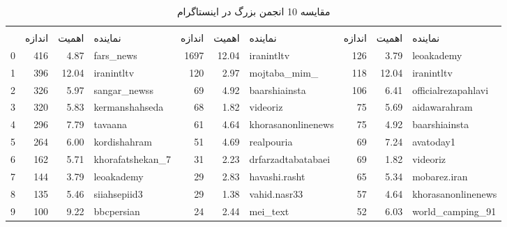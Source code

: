 \documentclass{article}
\begin{document}
	\begin{table}[h!]
		\centering
		\caption{مقایسه 10 انجمن بزرگ در اینستاگرام}
		\label{tab:instagram}
		\begin{tabular}{lrrlrrlrrl}
			\toprule
			& \multicolumn{3}{c}{\lr{Louvain}} & \multicolumn{3}{c}{\lr{Label Propagation}} & \multicolumn{3}{c}{\lr{Infomap}} \\
			\cmidrule(lr){2-4} \cmidrule(lr){5-7} \cmidrule(lr){8-10}
			& اندازه & اهمیت & نماینده & اندازه & اهمیت & نماینده & اندازه & اهمیت & نماینده \\
			0 & 416 & 4.87 & fars\_news & 1697 & 12.04 & iranintltv & 126 & 3.79 & leoakademy \\
			1 & 396 & 12.04 & iranintltv & 120 & 2.97 & mojtaba\_mim\_ & 118 & 12.04 & iranintltv \\
			2 & 326 & 5.97 & sangar\_newss & 69 & 4.92 & baarshiainsta & 106 & 6.41 & officialrezapahlavi \\
			3 & 320 & 5.83 & kermanshahseda & 68 & 1.82 & videoriz & 75 & 5.69 & aidawarahram \\
			4 & 296 & 7.79 & tavaana & 61 & 4.64 & khorasanonlinenews & 75 & 4.92 & baarshiainsta \\
			5 & 264 & 6.00 & kordishahram & 51 & 4.69 & realpouria & 69 & 7.24 & avatoday1 \\
			6 & 162 & 5.71 & khorafatshekan\_7 & 31 & 2.23 & drfarzadtabatabaei & 69 & 1.82 & videoriz \\
			7 & 144 & 3.79 & leoakademy & 29 & 2.83 & havashi.rasht & 65 & 5.34 & mobarez.iran \\
			8 & 135 & 5.46 & siiahsepiid3 & 29 & 1.38 & vahid.nasr33 & 57 & 4.64 & khorasanonlinenews \\
			9 & 100 & 9.22 & bbcpersian & 24 & 2.44 & mei\_text & 52 & 6.03 & world\_camping\_91 \\
			\bottomrule
		\end{tabular}
	\end{table}
	
\end{document}
